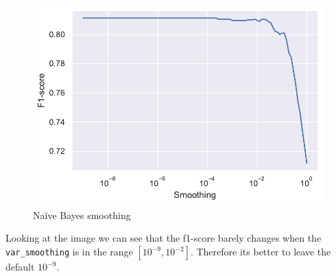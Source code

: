 \begin{figure}[H]
    \centering
    \includegraphics{figures/naive_bayes_smoothing_cv.pdf}
    \caption{Na\"ive Bayes smoothing}%
    \label{fig:naive_bayes_smoothing_cv}
\end{figure}

Looking at the image we can see that the f1-score barely changes when the \texttt{var\_smoothing} is in the range $[10^{-9}, 10^{-2}]$. Therefore its better to leave the default $10^{-9}$.
